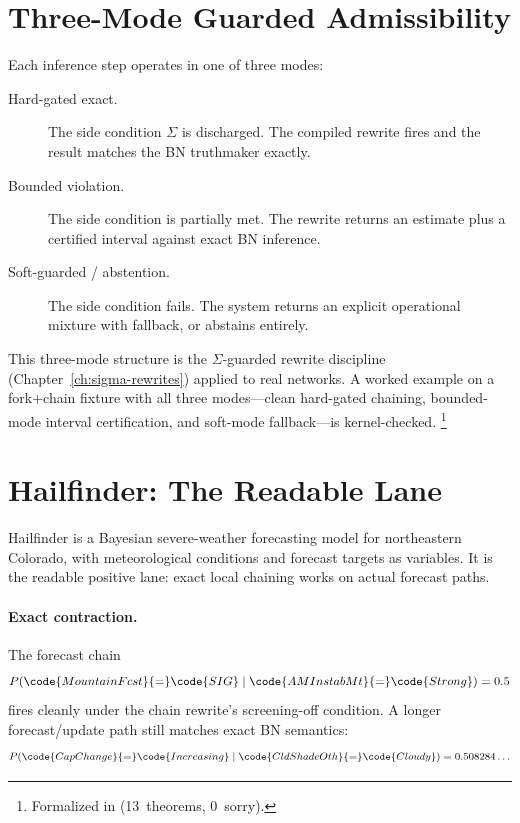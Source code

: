 \documentclass[11pt,openany]{report}
\begin{document}
\section{Three-Mode Guarded Admissibility}

Each inference step operates in one of three modes:

\begin{description}
\item[Hard-gated exact.] The side condition $\Sigma$ is
  discharged.  The compiled rewrite fires and the result matches
  the BN truthmaker exactly.

\item[Bounded violation.] The side condition is partially met.
  The rewrite returns an estimate plus a certified interval
  against exact BN inference.

\item[Soft-guarded / abstention.] The side condition fails.
  The system returns an explicit operational mixture with
  fallback, or abstains entirely.
\end{description}

\noindent
This three-mode structure is the $\Sigma$-guarded rewrite
discipline (Chapter~\ref{ch:sigma-rewrites}) applied to real
networks.  A worked example on a fork+chain fixture with all
three modes---clean hard-gated chaining, bounded-mode interval
certification, and soft-mode fallback---is kernel-checked.%
\footnote{Formalized in
(13~theorems, 0~sorry).}


\section{Hailfinder: The Readable Lane}

Hailfinder is a Bayesian severe-weather forecasting model for
northeastern Colorado, with meteorological conditions and forecast
targets as variables.  It is the readable positive lane: exact
local chaining works on actual forecast paths.

\paragraph{Exact contraction.}
The forecast chain
\[
  P(\code{MountainFcst}{=}\code{SIG} \mid
    \code{AMInstabMt}{=}\code{Strong}) = 0.5
\]
fires cleanly under the chain rewrite's screening-off condition.
A longer forecast/update path still matches exact BN semantics:
\[
  P(\code{CapChange}{=}\code{Increasing} \mid
    \code{CldShadeOth}{=}\code{Cloudy}) = 0.508284\ldots
\]
\end{document}
